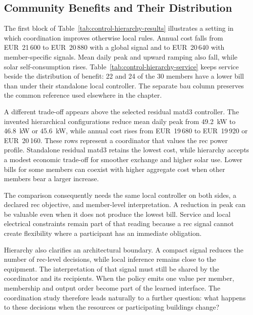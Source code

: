 \subsection{Community Benefits and Their Distribution}





\illustrativereading The first block of Table~\ref{tab:control-hierarchy-results} illustrates a setting in which coordination improves otherwise local rules. Annual cost falls from EUR~21\,600 to EUR~20\,880 with a global signal and to EUR~20\,640 with member-specific signals. Mean daily peak and upward ramping also fall, while solar self-consumption rises. Table~\ref{tab:control-hierarchy-service} keeps service beside the distribution of benefit: 22 and 24 of the 30 members have a lower bill than under their standalone local controller. The separate \gls{bau} column preserves the common reference used elsewhere in the chapter.

\illustrativereading A different trade-off appears above the selected residual \gls{matd3} controller. The invented hierarchical configurations reduce mean daily peak from 49.2~kW to 46.8~kW or 45.6~kW, while annual cost rises from EUR~19\,680 to EUR~19\,920 or EUR~20\,160. These rows represent a coordinator that values the \gls{rec} power profile. Standalone residual \gls{matd3} retains the lowest cost, while hierarchy accepts a modest economic trade-off for smoother exchange and higher solar use. Lower bills for some members can coexist with higher aggregate cost when other members bear a larger increase.

The comparison consequently needs the same local controller on both sides, a declared \gls{rec} objective, and member-level interpretation. A reduction in peak can be valuable even when it does not produce the lowest bill. Service and local electrical constraints remain part of that reading because a \gls{rec} signal cannot create flexibility where a participant has an immediate obligation.

Hierarchy also clarifies an architectural boundary. A compact signal reduces the number of \gls{rec}-level decisions, while local inference remains close to the equipment. The interpretation of that signal must still be shared by the coordinator and its recipients. When the policy emits one value per member, membership and output order become part of the learned interface. The coordination study therefore leads naturally to a further question: what happens to these decisions when the resources or participating buildings change?



